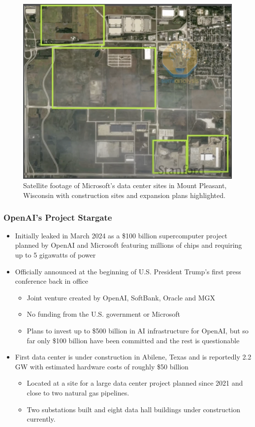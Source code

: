 \documentclass[aspectratio=169]{beamer}
\begin{document}
    \begin{frame}
        \begin{figure}
            \includegraphics[height=0.5\textwidth]{images/microsoft-mount-pleasant-satellite-footage}
            \caption{Satellite footage of Microsoft's data center sites in Mount Pleasant, Wisconsin with construction sites and expansion plans highlighted.~\parencite{patel_stanford_lecture_2024}}
        \end{figure}
    \end{frame}
    \begin{frame}
        \frametitle{OpenAI's Project Stargate}
        \begin{itemize}
            \item Initially leaked in March 2024 as a \$100 billion supercomputer project planned by OpenAI and Microsoft featuring millions of chips and requiring up to 5 gigawatts of power~\parencite{the_information_stargate_2024}
            \item Officially announced at the beginning of U.S. President Trump's first press conference back in office~\parencite{white_house_youtube_trump_infrastructure_remarks_2025}
            \begin{itemize}
                \item Joint venture created by OpenAI, SoftBank, Oracle and MGX
                \item No funding from the U.S. government or Microsoft
                \item Plans to invest up to \$500 billion in AI infrastructure for OpenAI, but so far only \$100 billion have been committed and the rest is questionable
            \end{itemize}
            \item First data center is under construction in Abilene, Texas and is reportedly 2.2 GW with estimated hardware costs of roughly \$50 billion~\parencite{patel_transcript_2025}
            \begin{itemize}
                \item Located at a site for a large data center project planned since 2021 and close to two natural gas pipelines.
                \item Two substations built and eight data hall buildings under construction currently.
            \end{itemize}
        \end{itemize}
    \end{frame}
\end{document}
